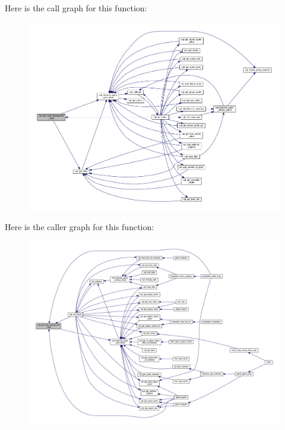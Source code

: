 Here is the call graph for this function\+:
\nopagebreak
\begin{figure}[H]
\begin{center}
\leavevmode
\includegraphics[width=350pt]{classsql_a5eb7fea00a56fe6ba33f602871798bc8_cgraph}
\end{center}
\end{figure}
Here is the caller graph for this function\+:
\nopagebreak
\begin{figure}[H]
\begin{center}
\leavevmode
\includegraphics[width=350pt]{classsql_a5eb7fea00a56fe6ba33f602871798bc8_icgraph}
\end{center}
\end{figure}
\mbox{\label{classsql_a9928c456c632f88d19cce26b8165bd6f}} 
